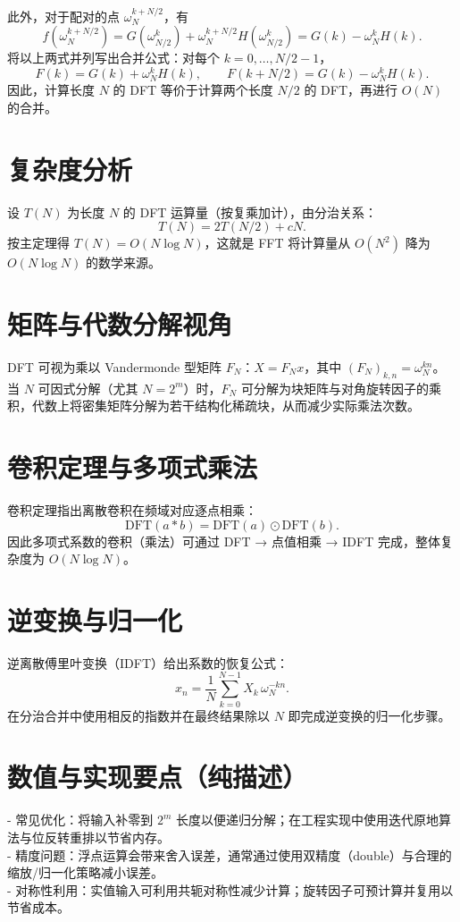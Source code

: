 \documentclass{ctexart}
\begin{document}
此外，对于配对的点 $\omega_N^{k+N/2}$，有
\[
f(\omega_N^{k+N/2})=G(\omega_{N/2}^k)+\omega_N^{k+N/2}H(\omega_{N/2}^k)=G(k)-\omega_N^{k}H(k).
\]
将以上两式并列写出合并公式：对每个 $k=0,\dots,N/2-1$，
\[
F(k)=G(k)+\omega_N^{k}H(k),\qquad F(k+N/2)=G(k)-\omega_N^{k}H(k).
\]
因此，计算长度 $N$ 的 DFT 等价于计算两个长度 $N/2$ 的 DFT，再进行 $O(N)$ 的合并。

\section{复杂度分析}
设 $T(N)$ 为长度 $N$ 的 DFT 运算量（按复乘加计），由分治关系：
\[
T(N)=2T(N/2)+cN.
\]
按主定理得 $T(N)=O(N\log N)$，这就是 FFT 将计算量从 $O(N^2)$ 降为 $O(N\log N)$ 的数学来源。

\section{矩阵与代数分解视角}
DFT 可视为乘以 Vandermonde 型矩阵 $F_N$：$X=F_N x$，其中 $(F_N)_{k,n}=\omega_N^{kn}$。
当 $N$ 可因式分解（尤其 $N=2^m$）时，$F_N$ 可分解为块矩阵与对角旋转因子的乘积，代数上将密集矩阵分解为若干结构化稀疏块，从而减少实际乘法次数。

\section{卷积定理与多项式乘法}
卷积定理指出离散卷积在频域对应逐点相乘：
\[
\mathrm{DFT}(a*b)=\mathrm{DFT}(a)\odot\mathrm{DFT}(b).
\]
因此多项式系数的卷积（乘法）可通过 DFT → 点值相乘 → IDFT 完成，整体复杂度为 $O(N\log N)$。

\section{逆变换与归一化}
逆离散傅里叶变换（IDFT）给出系数的恢复公式：
\[
x_n=\frac{1}{N}\sum_{k=0}^{N-1} X_k\,\omega_N^{-kn}.
\]
在分治合并中使用相反的指数并在最终结果除以 $N$ 即完成逆变换的归一化步骤。

\section{数值与实现要点（纯描述）}
- 常见优化：将输入补零到 $2^m$ 长度以便递归分解；在工程实现中使用迭代原地算法与位反转重排以节省内存。\\ 
- 精度问题：浮点运算会带来舍入误差，通常通过使用双精度（double）与合理的缩放/归一化策略减小误差。\\ 
- 对称性利用：实值输入可利用共轭对称性减少计算；旋转因子可预计算并复用以节省成本。
\end{document}
